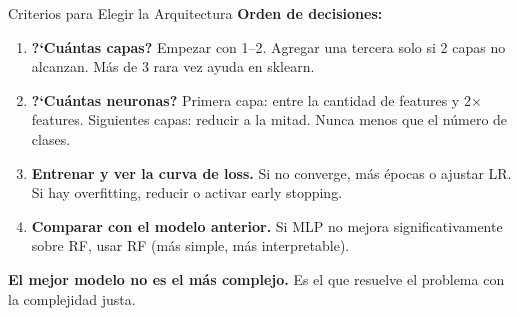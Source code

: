 \documentclass[aspectratio=169, 11pt]{beamer}
\begin{document}
\begin{frame}{Criterios para Elegir la Arquitectura}
  \vspace{-4pt}
  {\footnotesize\color{arcaDark}\bfseries
    Orden de decisiones:}

  \vspace{6pt}
  {\footnotesize
  \begin{enumerate}\setlength{\itemsep}{5pt}
    \item[{\color{arcaRed}\bfseries 1.}]
      \textbf{?`Cu\'antas capas?} Empezar con 1--2. Agregar una tercera
      solo si 2 capas no alcanzan. M\'as de 3 rara vez ayuda en sklearn.
    \item[{\color{arcaRed}\bfseries 2.}]
      \textbf{?`Cu\'antas neuronas?} Primera capa: entre la cantidad
      de features y 2$\times$ features. Siguientes capas: reducir
      a la mitad. Nunca menos que el n\'umero de clases.
    \item[{\color{arcaRed}\bfseries 3.}]
      \textbf{Entrenar y ver la curva de loss.} Si no converge,
      m\'as \'epocas o ajustar LR. Si hay overfitting, reducir
      o activar early stopping.
    \item[{\color{codeGreen}\bfseries 4.}]
      \textbf{Comparar con el modelo anterior.} Si MLP no mejora
      significativamente sobre RF, usar RF (m\'as simple, m\'as
      interpretable).
  \end{enumerate}
  }

  \vspace{4pt}
  \begin{tcolorbox}[colback=arcaGray, colframe=arcaRed, boxrule=0.5pt, arc=2pt,
    left=6pt, right=6pt, top=4pt, bottom=4pt]
    {\scriptsize\color{arcaDark}
    \faKey\hspace{4pt}\textbf{El mejor modelo no es el m\'as complejo.}
    Es el que resuelve el problema con la complejidad justa.}
  \end{tcolorbox}
\end{frame}
\end{document}
